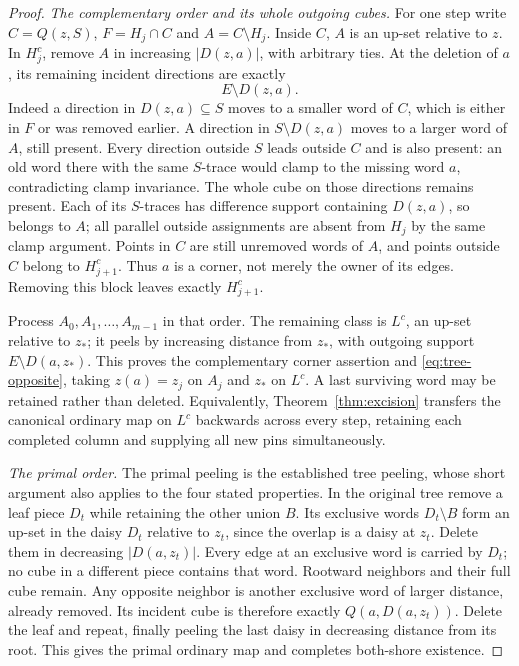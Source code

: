 \documentclass[11pt]{article}
\theoremstyle{definition}
\begin{document}
\begin{proof}
\emph{The complementary order and its whole outgoing cubes.}
For one step write $C=Q(z,S)$, $F=H_j\cap C$ and $A=C\setminus H_j$.
Inside $C$, $A$ is an up-set relative to $z$.
In $H_j^c$, remove $A$ in increasing $|D(z,a)|$, with arbitrary ties.
At the deletion of $a$, its remaining incident directions are exactly
\[
                         E\setminus D(z,a).
\]
Indeed a direction in $D(z,a)\subseteq S$ moves to a smaller word of
$C$, which is either in $F$ or was removed earlier. A direction in
$S\setminus D(z,a)$ moves to a larger word of $A$, still present.
Every direction outside $S$ leads outside $C$ and is also present:
an old word there with the same $S$-trace would clamp to the missing
word $a$, contradicting clamp invariance.
The whole cube on those directions remains present. Each of its
$S$-traces has difference support containing $D(z,a)$, so belongs to $A$;
all parallel outside assignments
are absent from $H_j$ by the same clamp argument. Points in $C$
are still unremoved words of $A$, and points outside $C$ belong to
$H_{j+1}^c$. Thus $a$ is a corner, not merely the owner of its edges.
Removing this block leaves exactly $H_{j+1}^c$.

Process $A_0,A_1,\ldots,A_{m-1}$ in that order. The remaining class
is $L^c$, an up-set relative to $z_*$; it peels by increasing distance
from $z_*$, with outgoing support $E\setminus D(a,z_*)$.
This proves the complementary corner assertion and
\eqref{eq:tree-opposite}, taking $z(a)=z_j$ on $A_j$ and $z_*$
on $L^c$. A last surviving word may be retained rather than deleted.
Equivalently, Theorem~\ref{thm:excision} transfers the canonical ordinary
map on $L^c$ backwards across every step, retaining each completed
column and supplying all new pins simultaneously.

\emph{The primal order.}
The primal peeling is the established tree peeling, whose short argument
also applies to the four stated properties. In the original tree remove
a leaf piece $D_t$ while retaining the other union $B$.
Its exclusive words $D_t\setminus B$ form an up-set in the daisy
$D_t$ relative to $z_t$, since the overlap is a daisy at $z_t$.
Delete them in decreasing $|D(a,z_t)|$.
Every edge at an exclusive word is carried by $D_t$; no cube in a
different piece contains that word. Rootward neighbors and their full
cube remain. Any opposite neighbor is another exclusive word of larger
distance, already removed. Its incident cube is therefore exactly
$Q(a,D(a,z_t))$. Delete the leaf and repeat, finally peeling the last
daisy in decreasing distance from its root. This gives the primal
ordinary map and completes both-shore existence.
\end{proof}
\end{document}
